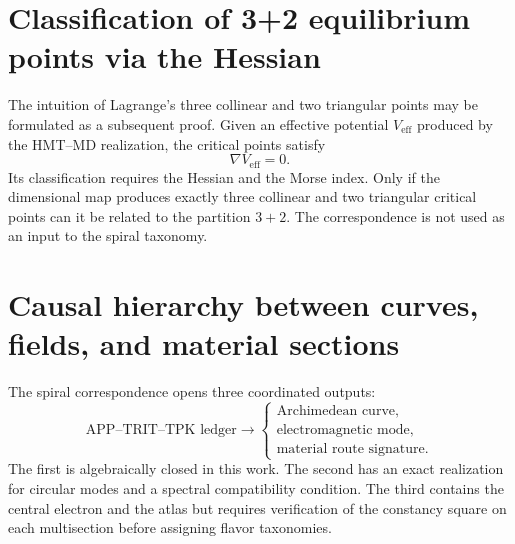 \section{Classification of 3+2 equilibrium points via the Hessian}

The intuition of Lagrange's three collinear and two triangular points may be
formulated as a subsequent proof. Given an effective potential
\(V_{\mathrm{eff}}\) produced by the HMT--MD realization, the critical points
satisfy
\[
 \nabla V_{\mathrm{eff}}=0.
\]
Its classification requires the Hessian and the Morse index. Only if the
dimensional map produces exactly three collinear and two triangular critical points
can it be related to the partition \(3+2\). The correspondence is not used
as an input to the spiral taxonomy.

\section{Causal hierarchy between curves, fields, and material sections}

The spiral correspondence opens three coordinated outputs:
\[
 \text{APP--TRIT--TPK ledger}
 \longrightarrow
 \begin{cases}
 \text{Archimedean curve},\\
 \text{electromagnetic mode},\\
 \text{material route signature}.
 \end{cases}
\]
The first is algebraically closed in this work. The second has
an exact realization for circular modes and a spectral
compatibility condition. The third contains the central electron and the
atlas but requires verification of the constancy square on each
multisection before assigning flavor taxonomies.
